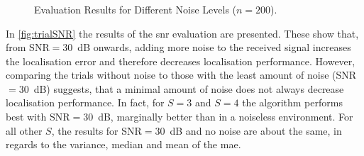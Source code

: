\subsubsection*{}
\begin{figure}[!ht]
\iftoggle{quick}{%
    \texttt{[image: plots/boxplots/boxplot-joined-SNR]}
}{%
    
}
	\caption[Evaluation Results for Different Noise Levels]{Evaluation Results for Different Noise Levels ($n=200$).}
	\label{fig:trialSNR}
\end{figure}

In \autoref{fig:trialSNR} the results of the \gls{snr} evaluation are presented. These show that, from SNR$=30$~dB onwards, adding more noise to the received signal increases the localisation error and therefore decreases localisation performance. However, comparing the trials without noise to those with the least amount of noise (SNR$=30$~dB) suggests, that a minimal amount of noise does not always decrease localisation performance. In fact, for $S=3$ and $S=4$ the algorithm performs best with SNR$=30$~dB, marginally better than in a noiseless environment. For all other $S$, the results for SNR$=30$~dB and no noise are about the same, in regards to the variance, median and mean of the \gls{mae}.